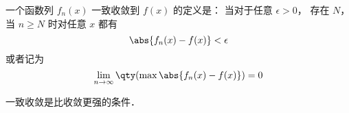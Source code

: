 
\begin{issues}
\issueDraft
\end{issues}

一个函数列 $f_n(x)$ 一致收敛到 $f(x)$ 的定义是： 当对于任意 $\epsilon > 0$， 存在 $N$， 当 $n \geqslant N$ 时对任意 $x$ 都有
\begin{equation}
\abs{f_n(x) - f(x)} < \epsilon
\end{equation}
或者记为
\begin{equation}
\lim_{n\to\infty} \qty(\max \abs{f_n(x) - f(x)}) = 0
\end{equation}

一致收敛是比收敛更强的条件．
